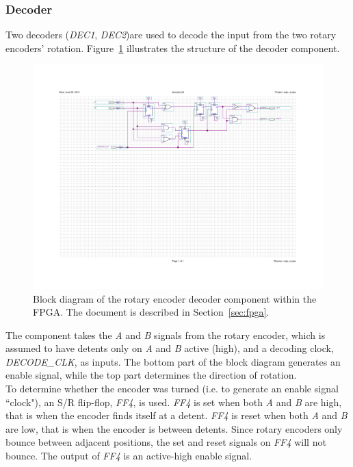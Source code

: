 \documentclass[titlepage]{scrartcl}
\begin{document}
	\clearpage
	
	\subsubsection{Decoder \label{sec:decoder}}
	Two decoders (\textit{DEC1}, \textit{DEC2})are used to decode the input from the two rotary encoders' rotation. Figure~\ref{fig:decoder_bdf} illustrates the structure of the decoder component.\\

	\begin{figure}[h!]
	\vspace{-4cm}
	\centerline{\includegraphics[width=30cm, angle=90, origin=c]{img/decoder.pdf}}	
		\vspace{-2cm}
                	\caption{Block diagram of the rotary encoder decoder component within the FPGA. The document is described in Section~\ref{sec:fpga}.}
               	\label{fig:decoder_bdf}
	\end{figure}

	The component takes the \textit{A} and \textit{B} signals from the rotary encoder, which is assumed to have detents only on \textit{A} and \textit{B} active (high), and a decoding clock, \textit{DECODE\_CLK}, as inputs. The bottom part of the block diagram generates an enable signal, while the top part determines the direction of rotation.\\

	To determine whether the encoder was turned (i.e. to generate an enable signal ``clock"), an S/R flip-flop, \textit{FF4}, is used. \textit{FF4} is set when both \textit{A} and \textit{B} are high, that is when the encoder finds itself at a detent. \textit{FF4} is reset when both \textit{A} and \textit{B} are low, that is when the encoder is between detents. Since rotary encoders only bounce between adjacent positions, the set and reset signals on \textit{FF4} will not bounce. The output of \textit{FF4} is an active-high enable signal.\\
\end{document}
